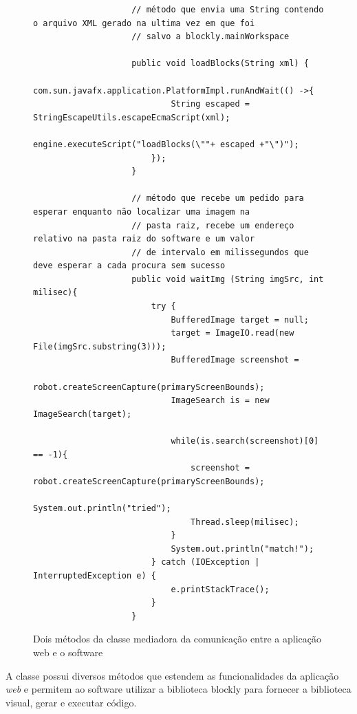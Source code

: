 \documentclass[tg]{mdtufsm}
\begin{document}
                \begin{figure}[!htb]
                \begin{lstlisting}
                    // método que envia uma String contendo o arquivo XML gerado na ultima vez em que foi
                    // salvo a blockly.mainWorkspace

                    public void loadBlocks(String xml) {
                        com.sun.javafx.application.PlatformImpl.runAndWait(() ->{
                            String escaped = StringEscapeUtils.escapeEcmaScript(xml);
                            engine.executeScript("loadBlocks(\""+ escaped +"\")");
                        });
                    }

                    // método que recebe um pedido para esperar enquanto não localizar uma imagem na
                    // pasta raiz, recebe um endereço relativo na pasta raiz do software e um valor
                    // de intervalo em milissegundos que deve esperar a cada procura sem sucesso
                    public void waitImg (String imgSrc, int milisec){
                        try {
                            BufferedImage target = null;
                            target = ImageIO.read(new File(imgSrc.substring(3)));
                            BufferedImage screenshot =
                                robot.createScreenCapture(primaryScreenBounds);
                            ImageSearch is = new ImageSearch(target);

                            while(is.search(screenshot)[0] == -1){
                                screenshot = robot.createScreenCapture(primaryScreenBounds);
                                System.out.println("tried");
                                Thread.sleep(milisec);
                            }
                            System.out.println("match!");
                        } catch (IOException | InterruptedException e) {
                            e.printStackTrace();
                        }
                    }
                \end{lstlisting}
                    \caption{Dois métodos da classe mediadora da comunicação entre a aplicação web e o software}
                	\label{code:javascriptmsg.java}
                \end{figure}

                A classe possui diversos métodos que estendem as funcionalidades da aplicação \emph{web} e permitem ao software utilizar a biblioteca blockly para fornecer a biblioteca visual, gerar e executar código.
\end{document}

